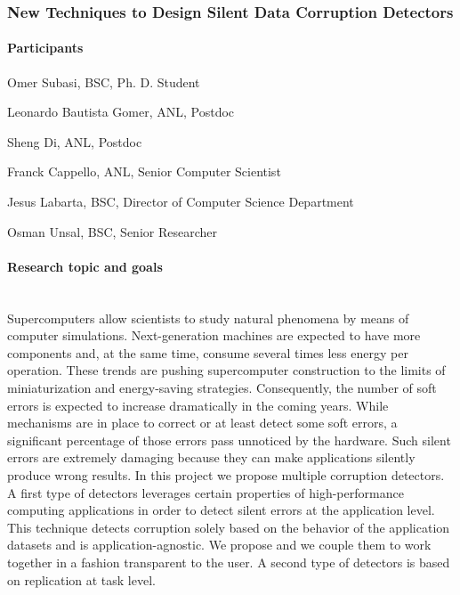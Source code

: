 
\subsubsection{New Techniques to Design Silent Data Corruption Detectors}
\label{Cappello-SDC-detectors} %

\begin{refsection}

\paragraph{Participants}

\begin{itemize*}
 \item Omer Subasi, BSC, Ph. D. Student 
 \item Leonardo Bautista Gomer, ANL, Postdoc 
 \item Sheng Di, ANL, Postdoc 
 \item Franck Cappello, ANL, Senior Computer Scientist
 \item Jesus Labarta, BSC, Director of Computer Science Department
 \item Osman Unsal, BSC, Senior Researcher 
 \end{itemize*}

\paragraph{Research topic and goals}~\\

Supercomputers allow scientists to study natural phenomena by means of computer simulations. Next-generation machines are expected to have more components and, at the same time, consume several times less energy per operation. These trends are pushing supercomputer construction to the limits of miniaturization and energy-saving strategies. Consequently, the number of soft errors is expected to increase dramatically in the coming years. While mechanisms are in place to correct or at least detect some soft errors, a significant percentage of those errors pass unnoticed by the hardware. Such silent errors are extremely damaging because
they can make applications silently produce wrong results. In this project we propose multiple corruption detectors. A first type of detectors leverages certain properties of high-performance computing applications in order to detect silent errors at the application level. This technique detects corruption solely based on the behavior of the application datasets and is application-agnostic. We propose and we couple them to work together in a fashion transparent to the user. A second type of detectors is based on replication at task level.


\end{refsection}
